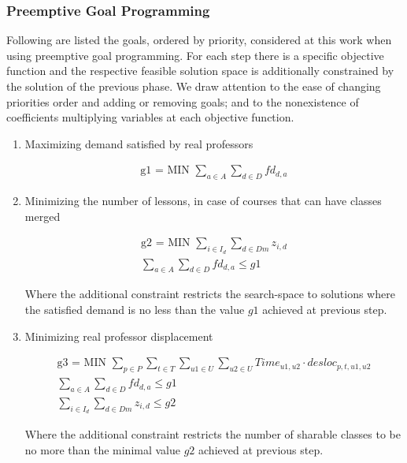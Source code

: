 \subsubsection{Preemptive Goal Programming}

Following are listed the goals, ordered by priority, considered at this work when using preemptive goal programming. For each step there is a specific objective function and the respective feasible solution space is additionally constrained by the solution of the previous phase. We draw attention to the ease of changing priorities order and adding or removing goals; and to the nonexistence of coefficients multiplying variables at each objective function.

\begin{enumerate}

\item{Maximizing demand satisfied by real professors}

\begin{align*}
   \mbox{g1 = MIN  } \sum\limits_{a \in A}\sum\limits_{d \in D} fd_{d,a}
\end{align*}

\item{Minimizing the number of lessons, in case of courses that can have classes merged}

\begin{align*}
  \mbox{g2 = MIN  } \sum\limits_{i \in I_{d}} \sum\limits_{d \in Dm} z_{i,d}
	\\
	\sum\limits_{a \in A}\sum\limits_{d \in D} fd_{d,a} \le g1
\end{align*}

Where the additional constraint restricts the search-space to solutions where the satisfied demand is no less than the value $g1$ achieved at previous step.

\item{Minimizing real professor displacement}

\begin{align*}
  \mbox{g3 = MIN  } \sum\limits_{p \in P} \sum\limits_{t \in T} \sum\limits_{u1 \in U} \sum\limits_{u2 \in U} Time_{u1,u2} \cdot desloc_{p,t,u1,u2}
	\\
	\sum\limits_{a \in A}\sum\limits_{d \in D} fd_{d,a} \le g1
	\\
	\sum\limits_{i \in I_{d}} \sum\limits_{d \in Dm} z_{i,d} \le g2
\end{align*}

Where the additional constraint restricts the number of sharable classes to be no more than the minimal value $g2$ achieved at previous step.


\end{enumerate}
